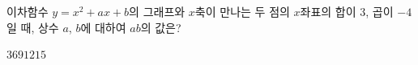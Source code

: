 이차함수 $y=x^2+ax+b$의 그래프와 $x$축이 만나는 두 점의 $x$좌표의 합이 $3$, 곱이 $-4$일 때, 상수 $a$, $b$에 대하여 $ab$의 값은?
\begin{choices32}{$3$}{$6$}{$9$}{$12$}{$15$}\end{choices32}
